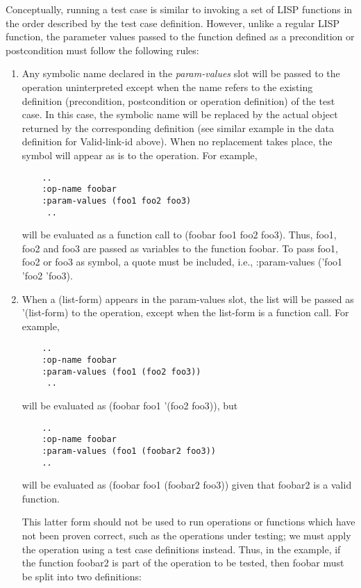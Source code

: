 Conceptually, running a test case is similar to invoking a set of LISP 
functions in the order described by the test case definition.
However, unlike a regular LISP function, the parameter values passed
to the function defined as a precondition or postcondition must
follow the following rules:
\begin {enumerate}
\item Any symbolic name declared in the {\it param-values} slot
will be passed to the operation uninterpreted except when the name
refers to the existing definition (precondition, postcondition or operation
definition) of the test case. In this case, the symbolic name
will be replaced by the actual object returned by the corresponding
definition (see similar example in the data definition for 
Valid-link-id above). When no replacement takes place,
the symbol will appear as is to the operation.
For example,
\small\begin{verbatim}
    ..
    :op-name foobar
    :param-values (foo1 foo2 foo3)
     ..
\end{verbatim}\normalsize

will be evaluated as a function call to (foobar foo1 foo2 foo3).
Thus, foo1, foo2 and foo3 are passed as variables  to the function
foobar.  To pass foo1, foo2 or foo3 as symbol, a quote must be 
included, i.e., :param-values ('foo1 'foo2 'foo3).


\item When a (list-form) appears in the param-values slot, the list
will be passed as '(list-form) to the operation, except when the
list-form is a function call.
For example,
\small\begin{verbatim}
    ..
    :op-name foobar
    :param-values (foo1 (foo2 foo3))
     ..
\end{verbatim}\normalsize

will be evaluated as (foobar foo1 '(foo2 foo3)), but


\small\begin{verbatim}
    ..
    :op-name foobar
    :param-values (foo1 (foobar2 foo3))
    ..
\end{verbatim}\normalsize

will be evaluated as (foobar foo1 (foobar2 foo3)) given that
foobar2 is a valid function.

This latter form should not be used to run  operations or functions
which have not been proven correct, such as the operations under testing; 
we must apply the operation using a test case definitions instead. 
Thus, in the example, if the function foobar2
is part of the operation to be tested, then foobar must be split into
two definitions:


\end{enumerate}
